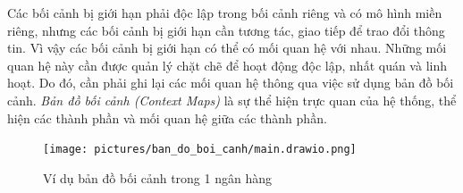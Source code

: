





Các bối cảnh bị giới hạn phải độc lập trong bối cảnh riêng và có mô hình miền riêng, nhưng các bối cảnh bị giới hạn cần tương tác, giao tiếp để trao đổi thông tin. Vì vậy các bối cảnh bị giới hạn có thể có mối quan hệ với nhau. Những mối quan hệ này cần được quản lý chặt chẽ để hoạt động độc lập, nhất quán và linh hoạt. Do đó, cần phải ghi lại các mối quan hệ thông qua việc sử dụng bản đồ bối cảnh. \emph{Bản đồ bối cảnh (Context Maps)} là sự thể hiện trực quan của hệ thống, thể hiện các thành phần và mối quan hệ giữa các thành phần.

\begin{figure}[H]

\centering

\texttt{[image: pictures/ban\_do\_boi\_canh/main.drawio.png]}

\caption{Ví dụ bản đồ bối cảnh trong 1 ngân hàng}

\end{figure}












% 


